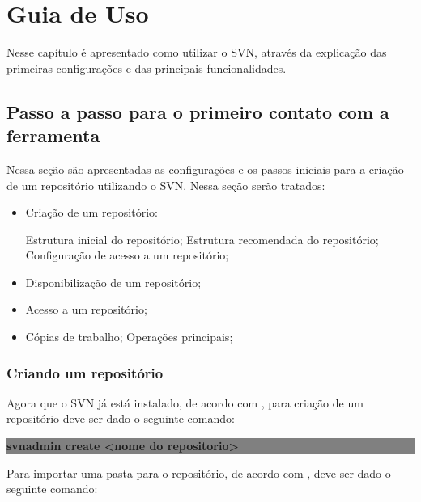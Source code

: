 \chapter[Guia de Uso]{Guia de Uso}

Nesse capítulo é apresentado como utilizar o SVN, através da explicação das primeiras configurações e das principais funcionalidades.

\section{Passo a passo para o primeiro contato com a ferramenta}

Nessa seção são apresentadas as configurações e os passos iniciais para a criação de um repositório utilizando o SVN. Nessa seção serão tratados:

\begin{itemize}

\item Criação de um repositório:

  \subitem Estrutura inicial do repositório;
  \subitem Estrutura recomendada do repositório;
  \subitem Configuração de acesso a um repositório;

\item Disponibilização de um repositório;

\item Acesso a um repositório;

\item Cópias de trabalho;
    \subitem Operações principais;

\end{itemize}

\subsection{Criando um repositório}

Agora que o SVN já está instalado, de acordo com , para criação de um repositório deve ser dado o seguinte comando:

\begin{centering}

\colorbox{Gray}{
\begin{minipage}{250px}
  \textbf{svnadmin create <nome do repositorio>}

\end{minipage}
}
\end{centering}

Para importar uma pasta para o repositório, de acordo com , deve ser dado o seguinte comando:


